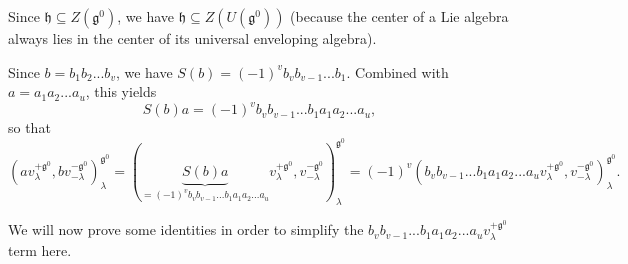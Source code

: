 \documentclass
[numbers=enddot,12pt,final,onecolumn,german,notitlepage]{scrartcl}%
\theoremstyle{definition}
\begin{document}
Since $\mathfrak{h}\subseteq Z\left(  \mathfrak{g}^{0}\right)  $, we have
$\mathfrak{h}\subseteq Z\left(  U\left(  \mathfrak{g}^{0}\right)  \right)  $
(because the center of a Lie algebra always lies in the center of its
universal enveloping algebra).

Since $b=b_{1}b_{2}...b_{v}$, we have $S\left(  b\right)  =\left(  -1\right)
^{v}b_{v}b_{v-1}...b_{1}$. Combined with $a=a_{1}a_{2}...a_{u}$, this yields%
\[
S\left(  b\right)  a=\left(  -1\right)  ^{v}b_{v}b_{v-1}...b_{1}a_{1}%
a_{2}...a_{u},
\]
so that%
\begin{equation}
\left(  av_{\lambda}^{+\mathfrak{g}^{0}},bv_{-\lambda}^{-\mathfrak{g}^{0}%
}\right)  _{\lambda}^{\mathfrak{g}^{0}}=\left(  \underbrace{S\left(  b\right)
a}_{=\left(  -1\right)  ^{v}b_{v}b_{v-1}...b_{1}a_{1}a_{2}...a_{u}}v_{\lambda
}^{+\mathfrak{g}^{0}},v_{-\lambda}^{-\mathfrak{g}^{0}}\right)  _{\lambda
}^{\mathfrak{g}^{0}}=\left(  -1\right)  ^{v}\left(  b_{v}b_{v-1}...b_{1}%
a_{1}a_{2}...a_{u}v_{\lambda}^{+\mathfrak{g}^{0}},v_{-\lambda}^{-\mathfrak{g}%
^{0}}\right)  _{\lambda}^{\mathfrak{g}^{0}}. \label{prop.det.US.pf.4}%
\end{equation}


We will now prove some identities in order to simplify the $b_{v}%
b_{v-1}...b_{1}a_{1}a_{2}...a_{u}v_{\lambda}^{+\mathfrak{g}^{0}}$ term here.
\end{document}
